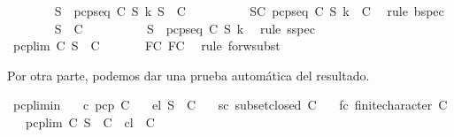 \begin{isabellebody}
\ \ \ \ \ \ \isamarkupfalse%
\ {\isachardoublequoteopen}{\isasymforall}S{\isacharprime}\ {\isasymsubseteq}\ {\isacharparenleft}pcp{\isacharunderscore}seq\ C\ S\ k{\isacharparenright}{\isachardot}\ S{\isacharprime}\ {\isasymin}\ C{\isachardoublequoteclose}\isanewline
\ \ \ \ \ \ \ \ \isamarkupfalse%
\ SC\ {\isacartoucheopen}pcp{\isacharunderscore}seq\ C\ S\ k\ {\isasymin}\ C{\isacartoucheclose}\ \isamarkupfalse%
\ {\isacharparenleft}rule\ bspec{\isacharparenright}\isanewline
\ \ \ \ \ \ \isamarkupfalse%
\ {\isachardoublequoteopen}S{\isacharprime}\ {\isasymin}\ C{\isachardoublequoteclose}\isanewline
\ \ \ \ \ \ \ \ \isamarkupfalse%
\ {\isacartoucheopen}S{\isacharprime}\ {\isasymsubseteq}\ pcp{\isacharunderscore}seq\ C\ S\ k{\isacartoucheclose}\ \isamarkupfalse%
\ {\isacharparenleft}rule\ sspec{\isacharparenright}\isanewline
\ \ \ \ \isamarkupfalse%
\isanewline
\ \ \isamarkupfalse%
\isanewline
\ \ \isamarkupfalse%
\ {\isachardoublequoteopen}pcp{\isacharunderscore}lim\ C\ S\ {\isasymin}\ C{\isachardoublequoteclose}\ \isanewline
\ \ \ \ \isamarkupfalse%
\ FC{}\ FC{}\ \isamarkupfalse%
\ {\isacharparenleft}rule\ forw{\isacharunderscore}subst{\isacharparenright}\isanewline
{}\isamarkupfalse%
%
\endisatagproof
{\isafoldproof}%
%
\isadelimproof
%
\endisadelimproof
%
\begin{isamarkuptext}%
Por otra parte, podemos dar una prueba automática del resultado.%
\end{isamarkuptext}\isamarkuptrue%
\isamarkupfalse%
\ pcp{\isacharunderscore}lim{\isacharunderscore}in{\isacharcolon}\isanewline
\ \ \ c{\isacharcolon}\ {\isachardoublequoteopen}pcp\ C{\isachardoublequoteclose}\isanewline
\ \ \ el{\isacharcolon}\ {\isachardoublequoteopen}S\ {\isasymin}\ C{\isachardoublequoteclose}\isanewline
\ \ \ sc{\isacharcolon}\ {\isachardoublequoteopen}subset{\isacharunderscore}closed\ C{\isachardoublequoteclose}\isanewline
\ \ \ fc{\isacharcolon}\ {\isachardoublequoteopen}finite{\isacharunderscore}character\ C{\isachardoublequoteclose}\isanewline
\ \ \ {\isachardoublequoteopen}pcp{\isacharunderscore}lim\ C\ S\ {\isasymin}\ C{\isachardoublequoteclose}\ {\isacharparenleft}\ {\isachardoublequoteopen}{\isacharquery}cl\ {\isasymin}\ C{\isachardoublequoteclose}{\isacharparenright}\isanewline

\end{isabellebody}
